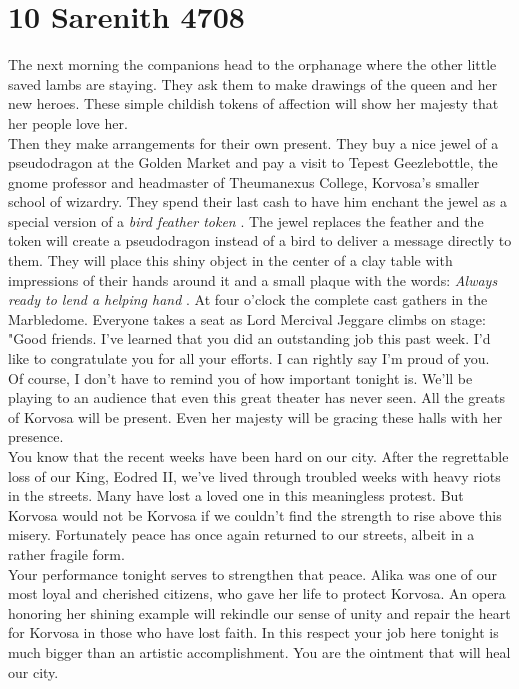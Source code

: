 \section{10 Sarenith 4708}

The next morning the companions head to the orphanage where the other little saved lambs are staying. They ask them to make drawings of the queen and her new heroes. These simple childish tokens of affection will show her majesty that her people love her.\\

Then they make arrangements for their own present. They buy a nice jewel of a pseudodragon at the Golden Market and pay a visit to Tepest Geezlebottle, the gnome professor and headmaster of Theumanexus College, Korvosa's smaller school of wizardry. They spend their last cash to have him enchant the jewel as a special version of a {\itshape bird feather token} . The jewel replaces the feather and the token will create a pseudodragon instead of a bird to deliver a message directly to them. They will place this shiny object in the center of a clay table with impressions of their hands around it and a small plaque with the words:  {\itshape Always ready to lend a helping hand} . At four o'clock the complete cast gathers in the Marbledome. Everyone takes a seat as Lord Mercival Jeggare climbs on stage:\\

"Good friends. I've learned that you did an outstanding job this past week. I'd like to congratulate you for all your efforts. I can rightly say I'm proud of you.\\

Of course, I don't have to remind you of how important tonight is. We'll be playing to an audience that even this great theater has never seen. All the greats of Korvosa will be present. Even her majesty will be gracing these halls with her presence.\\

You know that the recent weeks have been hard on our city. After the regrettable loss of our King, Eodred II, we've lived through troubled weeks with heavy riots in the streets. Many have lost a loved one in this meaningless protest. But Korvosa would not be Korvosa if we couldn't find the strength to rise above this misery. Fortunately peace has once again returned to our streets, albeit in a rather fragile form.\\

Your performance tonight serves to strengthen that peace. Alika was one of our most loyal and cherished citizens, who gave her life to protect Korvosa. An opera honoring her shining example will rekindle our sense of unity and repair the heart for Korvosa in those who have lost faith. In this respect your job here tonight is much bigger than an artistic accomplishment. You are the ointment that will heal our city.\\

